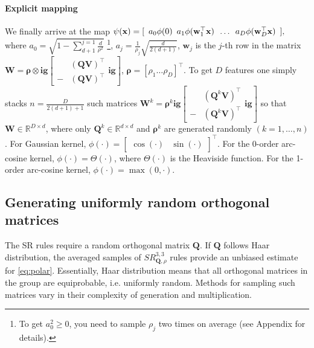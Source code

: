 \paragraph{Explicit mapping} We finally arrive at the map
${\psi(\mathbf{x}) = [ \enskip a_0 \phi(0) \enskip 
	a_1 \phi(\mathbf{w}_1^{\top} \mathbf{x})
	\enskip \dots \enskip
	a_D \phi(\mathbf{w}_{D}^\top \mathbf{x}) \enskip],}$
where $a_0 = \sqrt{1 - \sum\limits_{d+1}^{j=1}\frac{d}{\rho^2}}$
\footnote{To get ${a_0^2 \geq 0}$, you need to sample $\rho_j$ two times on average (see Appendix for details).}, $a_j = \frac{1}{\rho_j}\sqrt{\frac{d}{2(d + 1)}}$, $\mathbf{w}_j$ is the $j$-th row in the matrix ${\mathbf{W} = \boldsymbol{\rho} \otimes \mathbf{ig}[

\begin{smallmatrix} & (\mathbf{QV}) ^\top \\ 
- & (\mathbf{QV})^\top \end{smallmatrix}

\mathbf{ig}]}$, ${\boldsymbol{\rho} = [ \rho_1 \dots \rho_D ]^{\top}}$.
To get $D$ features one simply stacks $n = \frac{D}{2(d+1)+1}$ such matrices
$\mathbf{W}^k = \boldsymbol{\rho}^k\mathbf{ig}[

\begin{smallmatrix} & (\mathbf{Q}^k\mathbf{V})^\top \\
- & (\mathbf{Q}^k\mathbf{V})^\top \end{smallmatrix}

\mathbf{ig}]$ 
so that $\mathbf{W} \in \mathbb{R}^{D \times d}$, where only $\mathbf{Q}^k \in \mathbb{R}^{d \times d}$ and ${\boldsymbol{\rho}^k}$ are generated randomly $(k=1,\dots, n)$. For Gaussian kernel, $\phi(\cdot) =

\begin{bmatrix}\cos(\cdot) & \sin(\cdot) \end{bmatrix}

^{\boldsymbol{\top}}$.
For the 0-order arc-cosine kernel, ${\phi(\cdot) = \Theta(\cdot)}$, where $\Theta(\cdot)$ is the Heaviside function. For the 1-order arc-cosine kernel, ${\phi(\cdot) = \max (0, \cdot)}$.

\subsection{Generating uniformly random orthogonal matrices}
\label{subsec:ortho}
The SR rules require a random orthogonal matrix $\mathbf{Q}$. If $\mathbf{Q}$ follows Haar distribution, the averaged samples of $SR^{3,3}_{\mathbf{Q}, \rho}$ rules provide an unbiased estimate for \eqref{eq:polar}.
Essentially, Haar distribution means that all orthogonal matrices in the group are equiprobable, i.e. uniformly random. Methods for sampling such matrices vary in their complexity of generation and multiplication.

